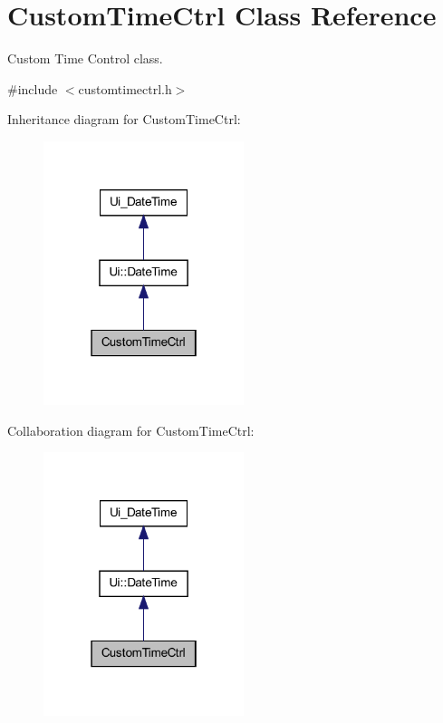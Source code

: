 \hypertarget{class_custom_time_ctrl}{
\section{CustomTimeCtrl Class Reference}
\label{class_custom_time_ctrl}
}


Custom Time Control class.  




{\ttfamily \#include $<$customtimectrl.h$>$}



Inheritance diagram for CustomTimeCtrl:\nopagebreak
\begin{figure}[H]
\begin{center}
\leavevmode
\includegraphics[width=166pt]{class_custom_time_ctrl__inherit__graph}
\end{center}
\end{figure}


Collaboration diagram for CustomTimeCtrl:\nopagebreak
\begin{figure}[H]
\begin{center}
\leavevmode
\includegraphics[width=166pt]{class_custom_time_ctrl__coll__graph}
\end{center}
\end{figure}
